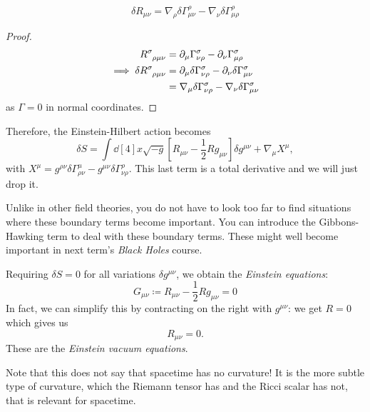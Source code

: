 \begin{claim}
  \begin{equation}
    \delta R_{\mu\nu} = \nabla_{\rho} \delta \Gamma^{\rho}_{\mu\nu} - \nabla_{\nu} \delta \Gamma^{\rho}_{\mu\rho}
  \end{equation}
\end{claim}
\begin{proof}
  \begin{align}
    R \indices{^{\sigma}_{\rho\mu\nu}} &= \partial_{\mu} \Gamma^{\sigma}_{\nu\rho} - \partial_{\nu} \Gamma^{\sigma}_{\mu\rho} \\
   \implies \delta R \indices{^{\sigma}_{\rho\mu\nu}} &= \partial_{\mu} \delta \Gamma^{\sigma}_{\nu\rho} - \partial_{\nu} \delta \Gamma^{\sigma}_{\mu\nu} \\
   &= \nabla_{\mu} \delta\Gamma^{\sigma}_{\nu\rho} - \nabla_{\nu} \delta\Gamma^{\sigma}_{\mu\nu}
  \end{align}
  as $\Gamma = 0$ in normal coordinates.
\end{proof}

Therefore, the Einstein-Hilbert action becomes
\begin{equation}
  \delta S = \int \dd[4]{x} \sqrt{-g} \left[ R_{\mu\nu} - \frac{1}{2} R g_{\mu\nu} \right] \delta g^{\mu\nu} + \nabla_{\mu} X^{\mu},
\end{equation}
with $X^{\mu} = g^{\rho\nu} \delta\Gamma^{\mu}_{\rho\nu} - g^{\mu\nu} \delta \Gamma^{\rho}_{\nu\rho}$. This last term is a total derivative and we will just drop it.
\begin{leftbar}
  \begin{remark}
    Unlike in other field theories, you do not have to look too far to find situations where these boundary terms become important.
    You can introduce the Gibbons-Hawking term to deal with these boundary terms. These might well become important in next term's \emph{Black Holes} course.
  \end{remark}
\end{leftbar}
Requiring $\delta S = 0$ for all variations $\delta g^{\mu\nu}$, we obtain the \emph{Einstein equations}:
\begin{equation}
  G_{\mu\nu} \coloneqq R_{\mu\nu} - \frac{1}{2} R g_{\mu\nu} = 0
\end{equation}
In fact, we can simplify this by contracting on the right with $g^{\mu\nu}$: we get $R = 0$ which gives us
\begin{equation}
  R_{\mu\nu} = 0.
\end{equation}
These are the \emph{Einstein vacuum equations}.
\begin{leftbar}
  \begin{remark}
    Note that this does not say that spacetime has no curvature! It is the more subtle type of curvature, which the Riemann tensor has and the Ricci scalar has not, that is relevant for spacetime.
  \end{remark}
\end{leftbar}

